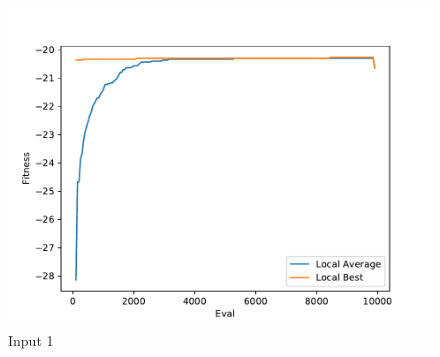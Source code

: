 \documentclass{standalone}
\begin{document}
\begin{figure}[!htb]
	\caption{Input 1}
	\label{fig:graph_1038}
	\includegraphics[width=\textwidth]{../graphs/graphs/1038.pdf}
\end{figure}
\end{document}
